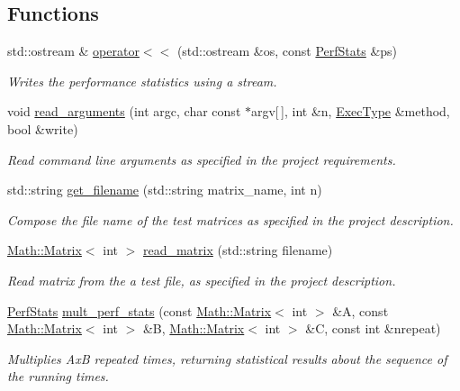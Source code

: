 \subsection*{Functions}
\begin{DoxyCompactItemize}
\item 
std\+::ostream \& \mbox{\hyperlink{namespaceMatTestUtils_a8d3fb72c1d83eeaef63f6255186d26c6}{operator$<$$<$}} (std\+::ostream \&os, const \mbox{\hyperlink{structMatTestUtils_1_1PerfStats}{Perf\+Stats}} \&ps)
\begin{DoxyCompactList}\small\item\em Writes the performance statistics using a stream. \end{DoxyCompactList}\item 
void \mbox{\hyperlink{namespaceMatTestUtils_affa961d32d7a7eb7addab0a07767f14f}{read\+\_\+arguments}} (int argc, char const $\ast$argv\mbox{[}$\,$\mbox{]}, int \&n, \mbox{\hyperlink{namespaceMatTestUtils_a8ce892071d861e65dd62ef377efaaa6b}{Exec\+Type}} \&method, bool \&write)
\begin{DoxyCompactList}\small\item\em Read command line arguments as specified in the project requirements. \end{DoxyCompactList}\item 
std\+::string \mbox{\hyperlink{namespaceMatTestUtils_a9e032c504f598952db985df790a0bcaa}{get\+\_\+filename}} (std\+::string matrix\+\_\+name, int n)
\begin{DoxyCompactList}\small\item\em Compose the file name of the test matrices as specified in the project description. \end{DoxyCompactList}\item 
\mbox{\hyperlink{classMath_1_1Matrix}{Math\+::\+Matrix}}$<$ int $>$ \mbox{\hyperlink{namespaceMatTestUtils_afe3ee64f63e541853b625e7ee33f32a8}{read\+\_\+matrix}} (std\+::string filename)
\begin{DoxyCompactList}\small\item\em Read matrix from the a test file, as specified in the project description. \end{DoxyCompactList}\item 
\mbox{\hyperlink{structMatTestUtils_1_1PerfStats}{Perf\+Stats}} \mbox{\hyperlink{namespaceMatTestUtils_acb8180416ec63f236bd49092434ce55e}{mult\+\_\+perf\+\_\+stats}} (const \mbox{\hyperlink{classMath_1_1Matrix}{Math\+::\+Matrix}}$<$ int $>$ \&A, const \mbox{\hyperlink{classMath_1_1Matrix}{Math\+::\+Matrix}}$<$ int $>$ \&B, \mbox{\hyperlink{classMath_1_1Matrix}{Math\+::\+Matrix}}$<$ int $>$ \&C, const int \&nrepeat)
\begin{DoxyCompactList}\small\item\em Multiplies AxB repeated times, returning statistical results about the sequence of the running times. \end{DoxyCompactList}\end{DoxyCompactItemize}
